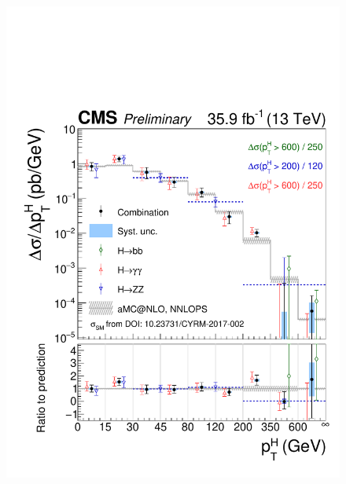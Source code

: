 \begin{figure}[hbtp]
  \begin{center}
    \includegraphics[width=\cmsFigWidth]{img/resultsapproval/reworked/spectra_pth_smH.pdf}

\end{center}
\end{figure}
